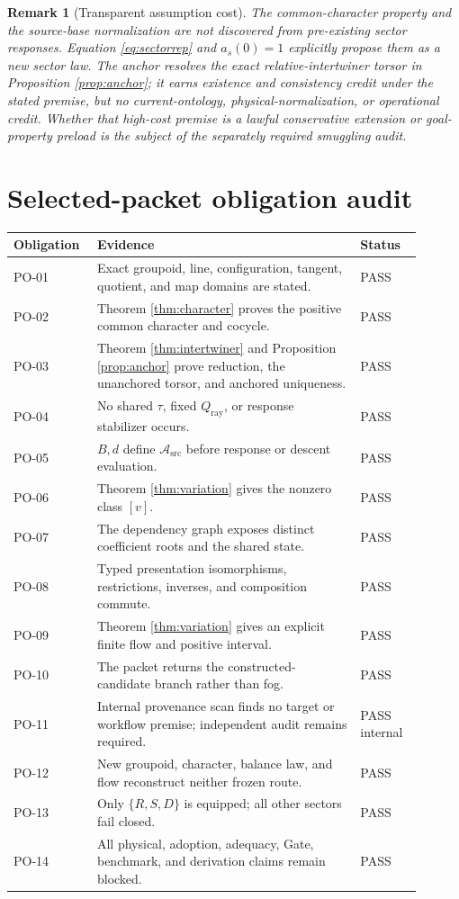 \documentclass[11pt]{article}
\newtheorem{remark}{Remark}
\newcommand{\Asrc}{\mathcal{A}_{\mathrm{src}}}
\begin{document}
\begin{remark}[Transparent assumption cost]
The common-character property and the source-base normalization are not
discovered from pre-existing sector responses.  Equation
\eqref{eq:sectorrep} and $a_s(0)=1$ explicitly propose them as a new sector law.
The anchor resolves the exact relative-intertwiner torsor in Proposition
\ref{prop:anchor}; it earns existence and consistency credit under the stated
premise, but no current-ontology, physical-normalization, or operational credit.
Whether that high-cost premise is a lawful conservative extension or
goal-property preload is the subject of the separately required smuggling
audit.
\end{remark}

\section{Selected-packet obligation audit}

\small
\begin{longtable}{>{\ttfamily}p{0.16\linewidth}p{0.60\linewidth}p{0.14\linewidth}}
\toprule
Obligation & Evidence & Status\\
\midrule
\endhead
PO-01 & Exact groupoid, line, configuration, tangent, quotient, and map domains are stated. & PASS\\
PO-02 & Theorem \ref{thm:character} proves the positive common character and cocycle. & PASS\\
PO-03 & Theorem \ref{thm:intertwiner} and Proposition \ref{prop:anchor} prove reduction, the unanchored torsor, and anchored uniqueness. & PASS\\
PO-04 & No shared $\tau$, fixed $Q_{\mathrm{ray}}$, or response stabilizer occurs. & PASS\\
PO-05 & $B,d$ define $\Asrc$ before response or descent evaluation. & PASS\\
PO-06 & Theorem \ref{thm:variation} gives the nonzero class $[v]$. & PASS\\
PO-07 & The dependency graph exposes distinct coefficient roots and the shared state. & PASS\\
PO-08 & Typed presentation isomorphisms, restrictions, inverses, and composition commute. & PASS\\
PO-09 & Theorem \ref{thm:variation} gives an explicit finite flow and positive interval. & PASS\\
PO-10 & The packet returns the constructed-candidate branch rather than fog. & PASS\\
PO-11 & Internal provenance scan finds no target or workflow premise; independent audit remains required. & PASS internal\\
PO-12 & New groupoid, character, balance law, and flow reconstruct neither frozen route. & PASS\\
PO-13 & Only $\{R,S,D\}$ is equipped; all other sectors fail closed. & PASS\\
PO-14 & All physical, adoption, adequacy, Gate, benchmark, and derivation claims remain blocked. & PASS\\
\bottomrule
\end{longtable}
\normalsize
\end{document}
